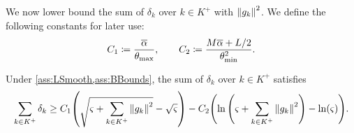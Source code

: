 \documentclass[journal_revised_MPC]{subfiles}
\begin{document}
We now lower bound the sum of $\delta_k$ over $k \in K^+$ with $\norm{g_{k}}^2$.
We define the following constants for later use:
\begin{equation}\label{eq:def_C1_C2}
    C_1 \coloneqq \frac{\overline{\alpha}}{\theta_{\max}}, \qquad
    C_2 \coloneqq \frac{M\overline{\alpha}+L/2}{\theta_{\min}^2}.
\end{equation}
\begin{lemma}\label{lem:sum_small_delta_k_bound_Kplus}
    Under \cref{ass:LSmooth,ass:BBounds}, the sum of $\delta_k$ over $k \in K^+$ satisfies
    \begin{equation*}
        \sum_{k \in K^+} \delta_k \ge
        C_1 \qty(\sqrt{\varsigma + \sum_{k \in K^+} \norm{g_{k}}^2} - \sqrt{\varsigma})
        - C_2 \qty(\ln\qty(\varsigma+\sum_{k \in K^+} \norm{g_{k}}^2) - \ln(\varsigma)).
    \end{equation*}
\end{lemma}
\end{document}
